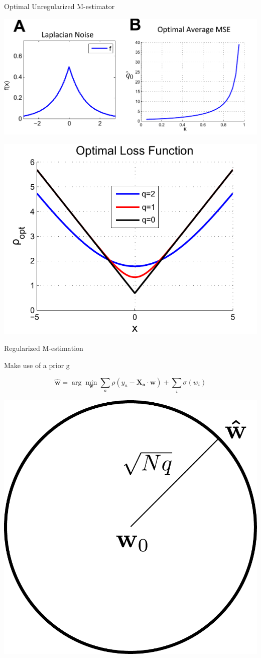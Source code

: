 \documentclass[pdf]{beamer}
\begin{document}
\begin{frame}{Optimal Unregularized M-estimator}


        \begin{center}
            \includegraphics[width = .5\linewidth]{unRegNoiseOpt.pdf}
        \end{center}


        \begin{center}
            \includegraphics[width = .5\linewidth]{opt_loss.pdf}
        \end{center}

\end{frame}


\begin{frame}{Regularized M-estimation}

Make use of a prior g

\begin{equation*}
            \mathbf{\hat{w}} = \arg\min_\mathbf{w} {\sum_a{\rho(y_a - \mathbf{X_a} \cdot\mathbf{ w})} + \sum_i{\sigma(w_i)}}
\end{equation*}


\begin{center}
        \includegraphics[width = .15\linewidth]{errorCircle.pdf}
    \end{center}




\end{frame}
\end{document}
